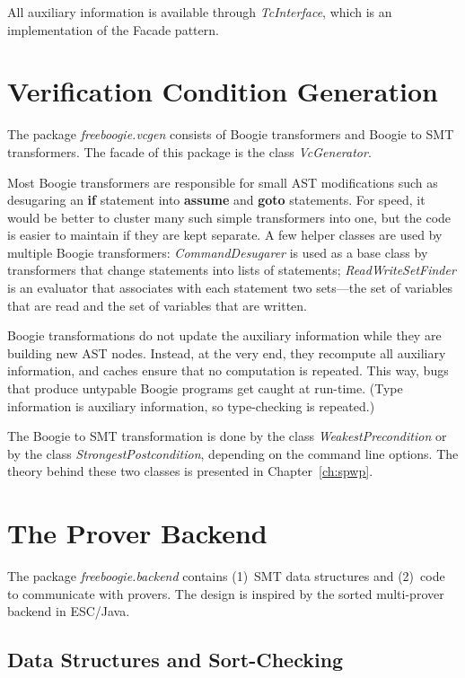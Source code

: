 \documentclass{llncs}
\newcommand{\escjava}{ESC\slash Java\xspace}
\begin{document}
All auxiliary information is available through
\textit{TcInterface}, which is an implementation of the Facade
pattern.

\section{Verification Condition Generation}

The package \textit{freeboogie.vcgen} consists of Boogie
transformers and Boogie to SMT transformers. The facade of this
package is the class \textit{VcGenerator}.

Most Boogie transformers are responsible for small AST
modifications such as desugaring an \textbf{if} statement
into \textbf{assume} and \textbf{goto} statements. For speed,
it would be better to cluster many such simple transformers
into one, but the code is easier to maintain if they are kept
separate. A few helper classes are used by multiple Boogie
transformers: \textit{CommandDesugarer} is used as a base class
by transformers that change statements into lists of statements;
\textit{ReadWriteSetFinder} is an evaluator that associates with
each statement two sets---the set of variables that are read and
the set of variables that are written.

Boogie transformations do not update the auxiliary information
while they are building new AST nodes. Instead, at the very end,
they recompute all auxiliary information, and caches ensure that
no computation is repeated. This way, bugs that produce untypable
Boogie programs get caught at run-time. (Type information is
auxiliary information, so type-checking is repeated.)

The Boogie to SMT transformation is done by the
class \textit{WeakestPrecondition} or by the class
\textit{StrongestPostcondition}, depending on the command line
options. The theory behind these two classes is presented in
Chapter~\ref{ch:spwp}.

\section{The Prover Backend}
\label{sec:design.backend}

The package \textit{freeboogie.backend} contains (1)~SMT data
structures and (2)~code to communicate with provers. The design
is inspired by the sorted multi-prover backend in \escjava.

\subsection{Data Structures and Sort-Checking}
\label{sec:design.ds}
\end{document}
